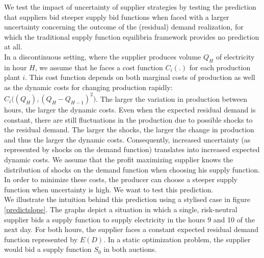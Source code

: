
We test the impact of uncertainty of supplier strategies by testing the prediction that suppliers bid steeper supply bid functions when faced with a larger uncertainty concerning the outcome of the (residual) demand realization, for which the traditional supply function equilibria framework provides no prediction at all.\\

In a discontinuous setting, where the supplier produces volume $Q_H$ of electricity in hour $H$, we assume that he faces a cost function $C_i(.)$ for each production plant $i$. This cost function depends on both marginal costs of production as well as the dynamic costs for changing production rapidly: $C_i \bigl( (Q_H), (Q_H - Q_{H-1})^2 \bigr)$. The larger the variation in production between hours, the larger the dynamic costs. 
Even when the expected residual demand is constant, there are still fluctuations in the production due to possible shocks to the residual demand. The larger the shocks, the larger the change in production and thus the larger the dynamic costs. 
Consequently, increased uncertainty (as represented by shocks on the demand function) translates into increased expected dynamic costs. We assume that the profit maximizing supplier knows the distribution of shocks on the demand function when choosing his supply function.  In order to minimize these costs, the producer can choose a steeper supply function when uncertainty is high. We want to test this prediction. \\

We illustrate the intuition behind this prediction using a stylised case in figure \ref{predictslope}. The graphs depict a situation in which a single, risk-neutral supplier bids a supply function to supply electricity in the hours 9 and 10 of the next day. For both hours, the supplier faces a constant expected residual demand function represented by $E(D)$. In a static optimization problem, the supplier would bid a supply function $S_0$ in both auctions. \\

